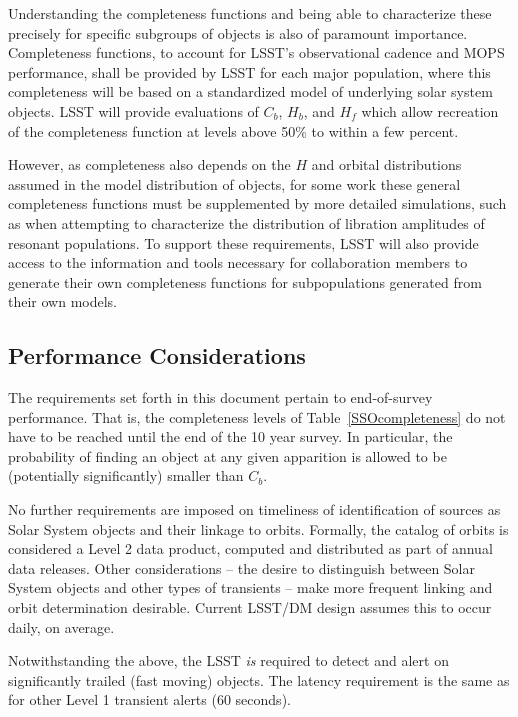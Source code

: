 \documentclass[manuscript]{aastex}
\begin{document}
Understanding the completeness functions and being able to characterize these precisely for specific subgroups of objects is also of paramount importance. Completeness functions, to account for LSST's observational cadence and MOPS performance, shall be provided by LSST for each major population, where this completeness will be based on a standardized model of underlying solar system objects. LSST will provide evaluations of $C_b$, $H_b$, and $H_f$ which allow recreation of the completeness function at levels above 50\% to within a few percent. 

However, as completeness also depends on the $H$ and orbital distributions assumed in the model distribution of objects, for some work these general completeness functions must be supplemented by more detailed simulations, such as when attempting to characterize the distribution of libration amplitudes of resonant populations. To support these requirements, LSST will also provide access to the information and tools necessary for collaboration members to generate their own completeness functions for subpopulations generated from their own models. 

\subsection{Performance Considerations}

The requirements set forth in this document pertain to end-of-survey performance. That is, the completeness levels of Table~\ref{SSOcompleteness} do not have to be reached until the end of the 10 year survey. In particular, the probability of finding an object at any given apparition is allowed to be (potentially significantly) smaller than $C_b$.

No further requirements are imposed on timeliness of identification of sources as Solar System objects and their linkage to orbits. Formally, the catalog of orbits is considered a Level 2 data product, computed and distributed as part of annual data releases. Other considerations -- the desire to distinguish between Solar System objects and other types of transients -- make more frequent linking and orbit determination desirable. Current LSST/DM design assumes this to occur daily, on average.

Notwithstanding the above, the LSST {\em is} required to detect and alert on significantly trailed (fast moving) objects. The latency requirement is the same as for other Level 1 transient alerts (60 seconds).
\end{document}
